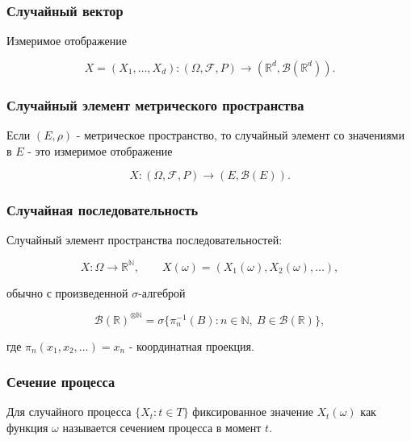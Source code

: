 \documentclass[
  11pt,
  a4paper,
]{article}
\begin{document}
\subsubsection{Случайный
вектор}\label{ux441ux43bux443ux447ux430ux439ux43dux44bux439-ux432ux435ux43aux442ux43eux440}

Измеримое отображение

\[
X=(X_1,\ldots,X_d):(\Omega,\mathcal F,P)\to(\mathbb R^d,\mathcal B(\mathbb R^d)).
\]

\subsubsection{Случайный элемент метрического
пространства}\label{ux441ux43bux443ux447ux430ux439ux43dux44bux439-ux44dux43bux435ux43cux435ux43dux442-ux43cux435ux442ux440ux438ux447ux435ux441ux43aux43eux433ux43e-ux43fux440ux43eux441ux442ux440ux430ux43dux441ux442ux432ux430}

Если \((E,\rho)\) - метрическое пространство, то случайный элемент со
значениями в \(E\) - это измеримое отображение

\[
X:(\Omega,\mathcal F,P)\to(E,\mathcal B(E)).
\]

\subsubsection{Случайная
последовательность}\label{ux441ux43bux443ux447ux430ux439ux43dux430ux44f-ux43fux43eux441ux43bux435ux434ux43eux432ux430ux442ux435ux43bux44cux43dux43eux441ux442ux44c}

Случайный элемент пространства последовательностей:

\[
X:\Omega\to\mathbb R^{\mathbb N},\qquad
X(\omega)=(X_1(\omega),X_2(\omega),\ldots),
\]

обычно с произведенной \(\sigma\)-алгеброй

\[
\mathcal B(\mathbb R)^{\otimes\mathbb N}
=
\sigma\{\pi_n^{-1}(B):n\in\mathbb N,\ B\in\mathcal B(\mathbb R)\},
\]

где \(\pi_n(x_1,x_2,\ldots)=x_n\) - координатная проекция.

\subsubsection{Сечение
процесса}\label{ux441ux435ux447ux435ux43dux438ux435-ux43fux440ux43eux446ux435ux441ux441ux430}

Для случайного процесса \(\{X_t:t\in T\}\) фиксированное значение
\(X_t(\omega)\) как функция \(\omega\) называется сечением процесса в
момент \(t\).
\end{document}
